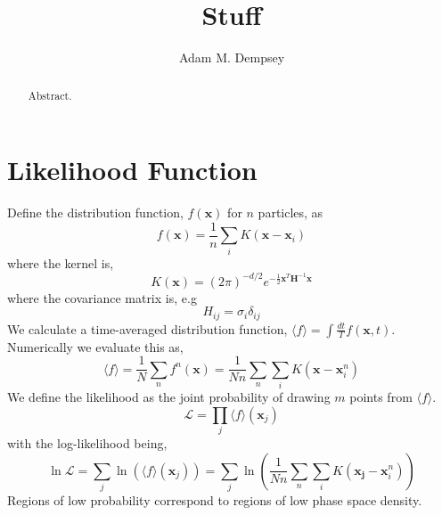 \documentclass[iop,onecolumn,numberedappendix,appendixfloats]{emulateapj}
\begin{document}
\title{Stuff}
\author{Adam M. Dempsey}

\begin{abstract}
Abstract.
\end{abstract}

\maketitle


\section{Likelihood Function}

Define the distribution function, $f(\mathbf{x})$ for $n$ particles, as 
\begin{equation}
f(\mathbf{x}) = \frac{1}{n} \sum_i  K\left(   \mathbf{x} - \mathbf{x}_i \right)
\end{equation}
where the kernel is,
\begin{equation}
K(\mathbf{x}) = \left( 2 \pi \right)^{-d/2} e^{ - \frac{1}{2} \mathbf{x}^T \mathbf{H}^{-1} \mathbf{x} }
\end{equation}
where the covariance matrix is, e.g
\begin{equation}
H_{ij} = \sigma_i \delta_{ij} 
\end{equation}
We calculate a time-averaged distribution function, $\langle f \rangle = \int \frac{dt}{T} f(\mathbf{x}, t)$. Numerically we evaluate this as,
\begin{equation}
\langle f \rangle = \frac{1}{N} \sum_{n} f^n(\mathbf{x}) =  \frac{1}{N n } \sum_{n} \sum_i K ( \mathbf{x} - \mathbf{x}_i^n )
\end{equation}
We define the likelihood as the joint probability of drawing $m$ points from $\langle f \rangle$. 
\begin{equation}
\mathcal{L} = \prod_j \langle f \rangle (\mathbf{x}_j)
\end{equation}
with the log-likelihood being,
\begin{equation}
\ln \mathcal{L} = \sum_j \ln \left( \langle f \rangle (\mathbf{x}_j) \right) =  \sum_j \ln \left(  \frac{1}{N n } \sum_{n} \sum_i K ( \mathbf{x_j} - \mathbf{x}_i^n ) \right) 
\end{equation}
Regions of low probability correspond to regions of low phase space density.
\end{document}
